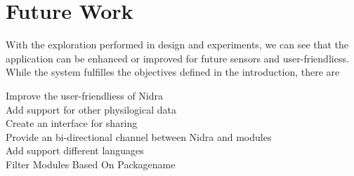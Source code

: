 \section{Future Work}
With the exploration performed in design and experiments, we can see that the application can be enhanced or improved for future sensors and user-friendliess. While the system fulfilles the objectives defined in the introduction, there are 

\begin{description}
    \item[Improve the user-friendliess of Nidra]
    \item[Add support for other physilogical data] 
    \item[Create an interface for sharing]
    \item[Provide an bi-directional channel between Nidra and modules]
    \item[Add support different languages] 
    \item[Filter Modules Based On Packagename]
\end{description}